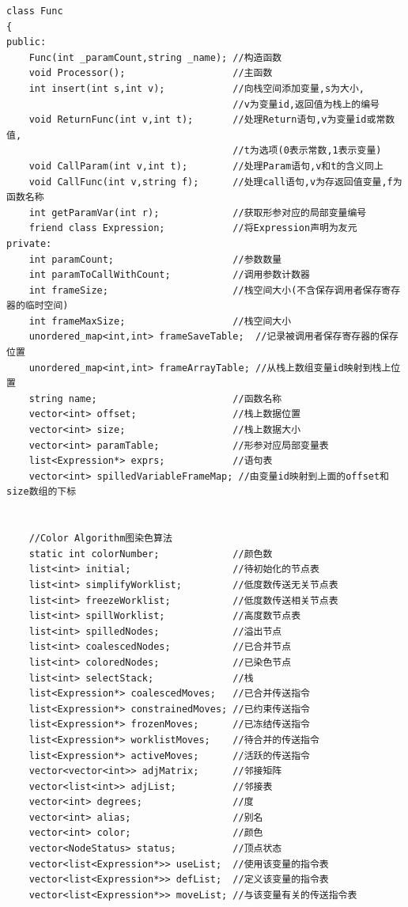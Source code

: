 \documentclass[UTF8]{article}
\begin{document}
\begin{lstlisting}
class Func
{
public:
    Func(int _paramCount,string _name); //构造函数
    void Processor();                   //主函数
    int insert(int s,int v);            //向栈空间添加变量,s为大小,
                                        //v为变量id,返回值为栈上的编号
    void ReturnFunc(int v,int t);       //处理Return语句,v为变量id或常数值,
                                        //t为选项(0表示常数,1表示变量)
    void CallParam(int v,int t);        //处理Param语句,v和t的含义同上
    void CallFunc(int v,string f);      //处理call语句,v为存返回值变量,f为函数名称
    int getParamVar(int r);             //获取形参对应的局部变量编号
    friend class Expression;            //将Expression声明为友元
private:
    int paramCount;                     //参数数量
    int paramToCallWithCount;           //调用参数计数器
    int frameSize;                      //栈空间大小(不含保存调用者保存寄存器的临时空间)
    int frameMaxSize;                   //栈空间大小
    unordered_map<int,int> frameSaveTable;  //记录被调用者保存寄存器的保存位置
    unordered_map<int,int> frameArrayTable; //从栈上数组变量id映射到栈上位置
    string name;                        //函数名称
    vector<int> offset;                 //栈上数据位置
    vector<int> size;                   //栈上数据大小
    vector<int> paramTable;             //形参对应局部变量表
    list<Expression*> exprs;            //语句表
    vector<int> spilledVariableFrameMap; //由变量id映射到上面的offset和size数组的下标


    //Color Algorithm图染色算法
    static int colorNumber;             //颜色数
    list<int> initial;                  //待初始化的节点表
    list<int> simplifyWorklist;         //低度数传送无关节点表
    list<int> freezeWorklist;           //低度数传送相关节点表
    list<int> spillWorklist;            //高度数节点表
    list<int> spilledNodes;             //溢出节点
    list<int> coalescedNodes;           //已合并节点
    list<int> coloredNodes;             //已染色节点
    list<int> selectStack;              //栈
    list<Expression*> coalescedMoves;   //已合并传送指令
    list<Expression*> constrainedMoves; //已约束传送指令
    list<Expression*> frozenMoves;      //已冻结传送指令
    list<Expression*> worklistMoves;    //待合并的传送指令
    list<Expression*> activeMoves;      //活跃的传送指令
    vector<vector<int>> adjMatrix;      //邻接矩阵
    vector<list<int>> adjList;          //邻接表
    vector<int> degrees;                //度
    vector<int> alias;                  //别名
    vector<int> color;                  //颜色
    vector<NodeStatus> status;          //顶点状态
    vector<list<Expression*>> useList;  //使用该变量的指令表
    vector<list<Expression*>> defList;  //定义该变量的指令表
    vector<list<Expression*>> moveList; //与该变量有关的传送指令表



\end{lstlisting}
\end{document}
